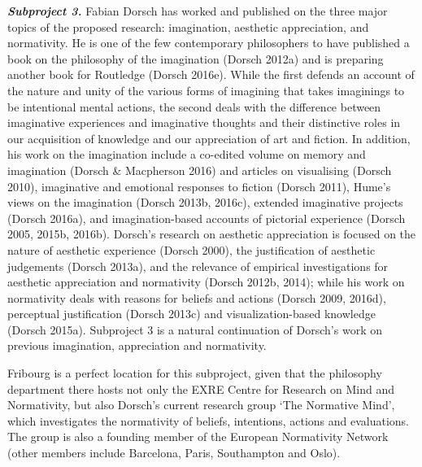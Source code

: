 \vspace{.2cm}
\noindent \textbf{\emph{Subproject 3.}} Fabian Dorsch has worked and published on the three major topics of the proposed research: imagination, aesthetic appreciation, and normativity. He is one of the few contemporary philosophers to have published a book on the philosophy of the imagination (Dorsch 2012a) and is preparing another book for Routledge (Dorsch 2016e). While the first defends an account of the nature and unity of the various forms of imagining that takes imaginings to be intentional mental actions, the second deals with the difference between imaginative experiences and imaginative thoughts and their distinctive roles in our acquisition of knowledge and our appreciation of art and fiction. In addition, his work on the imagination include a co-edited volume on memory and imagination (Dorsch \& Macpherson 2016) and articles on visualising (Dorsch 2010), imaginative and emotional responses to fiction (Dorsch 2011), Hume's views on the imagination (Dorsch 2013b, 2016c), extended imaginative projects (Dorsch 2016a), and imagination-based accounts of pictorial experience (Dorsch 2005, 2015b, 2016b). Dorsch's research on aesthetic appreciation is focused on the nature of aesthetic experience (Dorsch 2000), the justification of aesthetic judgements (Dorsch 2013a), and the relevance of empirical investigations for aesthetic appreciation and normativity (Dorsch 2012b, 2014); while his work on normativity deals with reasons for beliefs and actions (Dorsch 2009, 2016d), perceptual justification (Dorsch 2013c) and visualization-based knowledge (Dorsch 2015a). Subproject 3 is a natural continuation of Dorsch's work on previous imagination, appreciation and normativity.

Fribourg is a perfect location for this subproject, given that the philosophy department there hosts not only the EXRE Centre for Research on Mind and Normativity, but also Dorsch's current research group `The Normative Mind', which investigates the normativity of beliefs, intentions, actions and evaluations. The group is also a founding member of the European Normativity Network (other members include Barcelona, Paris, Southampton and Oslo). %
